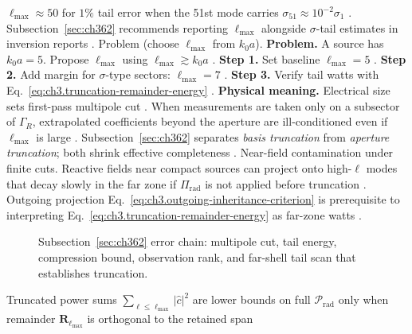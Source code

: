 \(\ell_{\max}\approx50\) for \(1\%\) tail error when the 51st mode carries \(\sigma_{51}\approx10^{-2}\sigma_{1}\)
\cite{harrington2001}. Subsection~\ref{sec:ch362} recommends reporting \(\ell_{\max}\) alongside \(\sigma\)-tail
estimates in inversion reports \cite{harrington2001}.
Problem (choose \(\ell_{\max}\) from \(k_{0}a\)). \textbf{Problem.} A source has \(k_{0}a=5\). Propose \(\ell_{\max}\) using \(\ell_{\max}\gtrsim k_{0}a\)
\cite{stratton1941}.
\textbf{Step 1.} Set baseline \(\ell_{\max}=5\) \cite{jackson1999}.
\textbf{Step 2.} Add margin for \(\sigma\)-type sectors: \(\ell_{\max}=7\) \cite{hansen1988}.
\textbf{Step 3.} Verify tail watts with Eq.~\eqref{eq:ch3.truncation-remainder-energy} \cite{harrington2001}.
\textbf{Physical meaning.} Electrical size sets first-pass multipole cut \cite{stratton1941}.
When measurements are taken only on a subsector of \(\Gamma_R\), extrapolated coefficients beyond the aperture are
ill-conditioned even if \(\ell_{\max}\) is large \cite{harrington2001}. Subsection~\ref{sec:ch362}
separates \emph{basis truncation} from \emph{aperture truncation}; both shrink effective completeness
\cite{stratton1941}.
Near-field contamination under finite cuts. Reactive fields near compact sources can project onto high-\(\ell\) modes that decay slowly in the far zone if
\(\Pi_{\mathrm{rad}}\) is not applied before truncation \cite{harrington2001}. Outgoing projection
Eq.~\eqref{eq:ch3.outgoing-inheritance-criterion} is prerequisite to interpreting
Eq.~\eqref{eq:ch3.truncation-remainder-energy} as far-zone watts \cite{poynting1884}.
\begin{figure}[t]
\centering
{}
\caption{Subsection~\ref{sec:ch362} error chain: multipole cut, tail energy, compression bound, observation rank,
and far-shell tail scan that establishes truncation.}
\label{fig:ch3.362-error-chain}
\end{figure}
Truncated power sums \(\sum_{\ell\le\ell_{\max}}|\widehat{c}|^{2}\) are lower bounds on full
\(\mathcal{P}_{\mathrm{rad}}\) only when remainder \(\mathbf{R}_{\ell_{\max}}\) is orthogonal to the retained span
